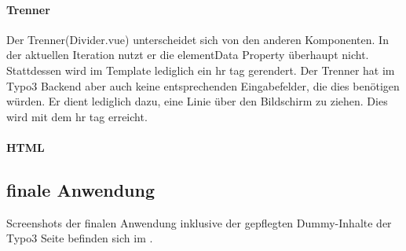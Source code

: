 \paragraph{Trenner}

Der Trenner(Divider.vue) unterscheidet sich von den anderen Komponenten. In der aktuellen Iteration nutzt er die elementData Property überhaupt nicht. Stattdessen wird im Template lediglich ein hr tag gerendert. Der Trenner hat im Typo3 Backend aber auch keine entsprechenden Eingabefelder, die dies benötigen würden. Er dient lediglich dazu, eine Linie über den Bildschirm zu ziehen. Dies wird mit dem hr tag erreicht.

\paragraph{HTML}

\subsection{finale Anwendung}
\label{sec:finale Anwendung}

Screenshots der finalen Anwendung inklusive der gepflegten Dummy-Inhalte der Typo3 Seite befinden sich im .
